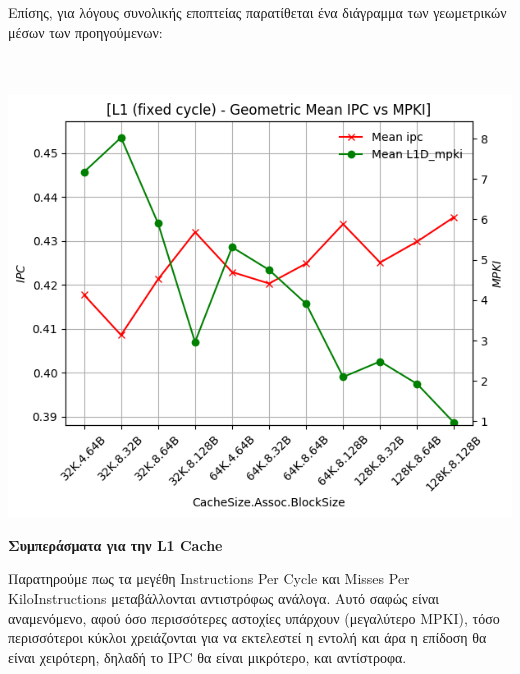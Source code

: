 Επίσης, για λόγους συνολικής εποπτείας παρατίθεται ένα διάγραμμα των γεωμετρικών μέσων των προηγούμενων:\\\\
\begin{minipage}{\textwidth}
    \begin{center}
        \\
        \vspace{3mm}
        \includegraphics[scale=0.60]{graphs/L1/fixed/mean.png}
        \vspace{6mm}
    \end{center}
\end{minipage}




\begin{center}
    \textbf{Συμπεράσματα για την \textlatin{L1 Cache}}    
\end{center}

Παρατηρούμε πως τα μεγέθη Instructions Per Cycle και Misses Per KiloInstructions
μεταβάλλονται αντιστρόφως ανάλογα. Αυτό σαφώς είναι αναμενόμενο, αφού όσο
περισσότερες αστοχίες υπάρχουν (μεγαλύτερο MPKI), τόσο περισσότεροι κύκλοι
χρειάζονται για να εκτελεστεί η εντολή και άρα η επίδοση θα είναι χειρότερη,
δηλαδή το IPC θα είναι μικρότερο, και αντίστροφα. 

